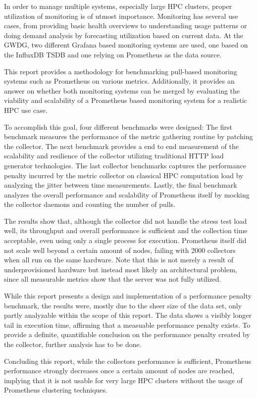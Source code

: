 In order to manage multiple systems, especially large \ac{HPC} clusters, proper utilization of monitoring is of utmost importance.
Monitoring has several use cases, from providing basic health overviews to understanding usage patterns or doing demand analysis by forecasting utilization based on current data.
At the GWDG, two different Grafana based monitoring systems are used, one based on the InfluxDB \ac{TSDB} and one relying on Prometheus as the data source.

This report provides a methodology for benchmarking pull-based monitoring systems such as Prometheus on various metrics. Additionally, it provides an answer on whether both monitoring systems can be merged by evaluating the viability and scalability of a Prometheus based monitoring system for a realistic \ac{HPC} use case.

To accomplish this goal, four different benchmarks were designed: The first benchmark measures the performance of the metric gathering routine by patching the collector. The next benchmark provides a end to end measurement of the scalability and resilience of the collector utilizing traditional HTTP load generator technologies. The last collector benchmarks captures the performance penalty incurred by the metric collector on classical HPC computation load by analyzing the jitter between time measurements. Lastly, the final benchmark analyzes the overall performance and scalability of Prometheus itself by mocking the collector daemons and counting the number of pulls.

The results show that, although the collector did not handle the stress test load well, its throughput and overall performance is sufficient and the collection time acceptable, even using only a single process for execution. Prometheus itself did not scale well beyond a certain amount of nodes, failing with 2000 collectors when all run on the same hardware. Note that this is not merely a result of underprovisioned hardware but instead most likely an architectural problem, since all measurable metrics show that the server was not fully utilized.

While this report presents a design and implementation of a performance penalty benchmark, the results were, mostly due to the sheer size of the data set, only partly analyzable within the scope of this report. The data shows a visibly longer tail in execution time, affirming that a measuable performance penalty exists. To provide a definite, quantifiable conclusion on the performance penalty created by the collector, further analysis has to be done.

Concluding this report, while the collectors performance is sufficient, Prometheus performance strongly decreases once a certain amount of nodes are reached, implying that it is not usable for very large \ac{HPC} clusters without the usage of Prometheus clustering techniques.

